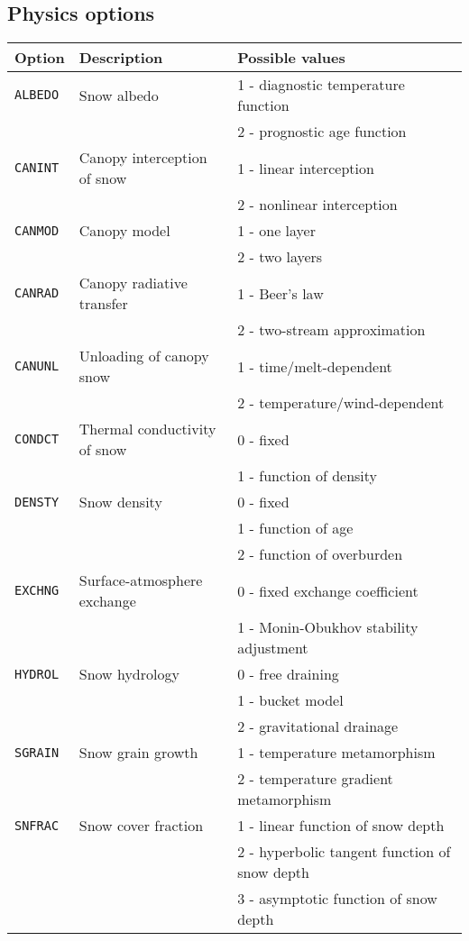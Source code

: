 \documentclass{article}
\begin{document}
\subsection{Physics options }
\begin{longtable}{|l|l|l|} \hline
Option       & Description & Possible values \\ \hline
{\tt ALBEDO} & Snow albedo
&   1 - diagnostic temperature function \\
& & 2 - prognostic age function         \\ \hline
{\tt CANINT} & Canopy interception of snow
&   1 - linear interception             \\
& & 2 - nonlinear interception          \\ \hline
{\tt CANMOD} & Canopy model
&   1 - one layer                       \\
& & 2 - two layers                      \\ \hline
{\tt CANRAD} & Canopy radiative transfer
&   1 - Beer's law                      \\
& & 2 - two-stream approximation        \\ \hline
{\tt CANUNL} & Unloading of canopy snow
&   1 - time/melt-dependent             \\
& & 2 - temperature/wind-dependent      \\ \hline
{\tt CONDCT} & Thermal conductivity of snow
&   0 - fixed                           \\
& & 1 - function of density             \\ \hline
{\tt DENSTY} & Snow density
&   0 - fixed                           \\
& & 1 - function of age                 \\
& & 2 - function of overburden          \\ \hline
{\tt EXCHNG} & Surface-atmosphere exchange
&   0 - fixed exchange coefficient      \\
& & 1 - Monin-Obukhov stability adjustment \\ \hline
{\tt HYDROL} & Snow hydrology
&   0 - free draining                   \\
& & 1 - bucket model                    \\
& & 2 - gravitational drainage          \\ \hline
{\tt SGRAIN} & Snow grain growth
&   1 - temperature metamorphism           \\ 
& & 2 - temperature gradient metamorphism  \\ \hline
{\tt SNFRAC} & Snow cover fraction
&   1 - linear function of snow depth             \\ 
& & 2 - hyperbolic tangent function of snow depth \\ 
& & 3 - asymptotic function of snow depth         \\ \hline
\end{longtable}
\end{document}
